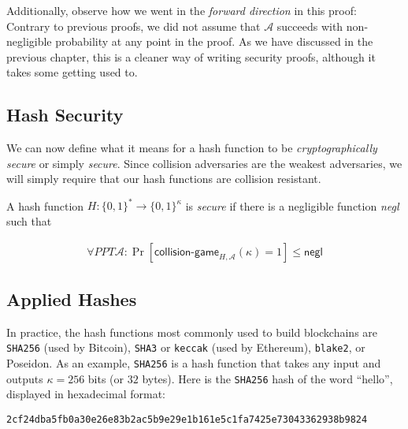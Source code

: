 Additionally, observe how we went in the \emph{forward direction} in this proof:
Contrary to previous proofs, we did not assume that $\mathcal{A}$ succeeds with non-negligible
probability at any point in the proof. As we have discussed in the previous chapter,
this is a cleaner way of writing security proofs, although it takes some getting used to.

\subsection*{Hash Security}

We can now define what it means for a hash function to be \emph{cryptographically secure}
or simply \emph{secure}. Since collision adversaries are the weakest adversaries, we will
simply require that our hash functions are collision resistant.

\begin{definition}
  A hash function $H: \{0, 1\}^* \longrightarrow \{0, 1\}^\kappa$ is \emph{secure} if there is a negligible function \emph{negl} such that

  \begin{gather*}
    \forall PPT \mathcal{A}:
      \Pr[\textsf{collision-game}_{H,\mathcal{A}}(\kappa) = 1] \leq \textsf{negl}
  \end{gather*}
\end{definition}

\subsection*{Applied Hashes}

In practice, the hash functions most commonly used to build blockchains are
\texttt{SHA256} (used by Bitcoin), \texttt{SHA3} or \texttt{keccak} (used by Ethereum),
\texttt{blake2}, or Poseidon. As an example, \texttt{SHA256} is a hash function that takes
any input and outputs $\kappa = 256$ bits (or $32$ bytes). Here is the \texttt{SHA256} hash
of the word ``hello'', displayed in hexadecimal format:

\texttt{2cf24dba5fb0a30e26e83b2ac5b9e29e1b161e5c1fa7425e73043362938b9824}

